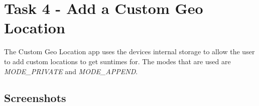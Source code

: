 \documentclass[11pt,english,numbers=endperiod,parskip=half]{scrartcl}
\begin{document}
\section{Task 4 - Add a Custom Geo Location}
The Custom Geo Location app uses the devices internal storage to allow the user
to add custom locations to get suntimes for. The modes that are used are
\textit{MODE\_PRIVATE} and \textit{MODE\_APPEND}.
\subsection{Screenshots}
\setlength\fboxsep{0pt}
\setlength\fboxrule{0.5pt}

\begin{figure}[H]
\\
\end{figure}

\begin{figure}[H]
\\
\end{figure}
\end{document}
